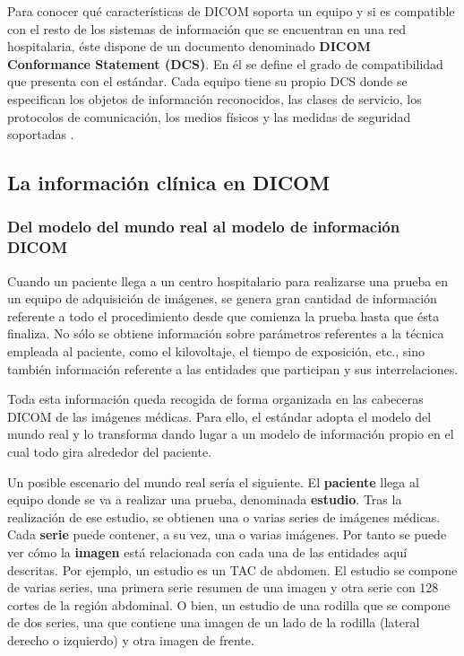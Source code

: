 Para conocer qué características de \acs{DICOM} soporta un equipo y si es compatible con el resto de los sistemas de información que se encuentran en una red hospitalaria, éste dispone de un documento denominado \textbf{\acs{DICOM} Conformance Statement (DCS)}. En él se  define el grado de compatibilidad que presenta con el estándar. Cada equipo tiene su propio DCS donde se especifican los objetos de información reconocidos, las clases de servicio, los protocolos de comunicación, los medios físicos y las medidas de seguridad soportadas \cite{12}.

\subsection{La información clínica en \acs{DICOM}}
\subsubsection{Del modelo del mundo real al modelo de información \acs{DICOM}}
Cuando un paciente llega a un centro hospitalario para realizarse una prueba en un equipo de adquisición de imágenes, se genera gran cantidad de información referente a todo el procedimiento desde que comienza la prueba hasta que ésta finaliza. No sólo se obtiene información sobre parámetros referentes a la técnica empleada al paciente, como el kilovoltaje, el tiempo de exposición, etc., sino también información referente a las entidades que participan y sus interrelaciones.

Toda esta información queda recogida de forma organizada en las cabeceras \acs{DICOM} de las imágenes médicas. Para ello, el estándar adopta el modelo del mundo real y lo transforma dando lugar a un modelo de información propio en el cual todo gira alrededor del paciente.

Un posible escenario del mundo real sería el siguiente. El \textbf{paciente} llega al equipo donde se va a realizar una prueba, denominada \textbf{estudio}. Tras la realización de ese estudio, se obtienen una o varias series de imágenes médicas. Cada \textbf{serie} puede contener, a su vez, una o varias imágenes. Por tanto se puede ver cómo la \textbf{imagen} está relacionada con cada una de las entidades aquí descritas. Por ejemplo, un estudio es un TAC de abdomen. El estudio se compone de varias series, una primera serie resumen de una imagen y otra serie con 128 cortes de la región abdominal. O bien, un estudio de una rodilla que se compone de dos series, una que contiene una imagen de un lado de la rodilla (lateral derecho o izquierdo) y otra imagen de frente.

